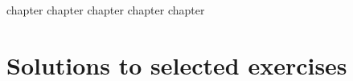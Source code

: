 

{chapter}
{chapter}
{chapter}
{chapter}
{chapter}

\chapter{Solutions to selected exercises}
\printsolutions
